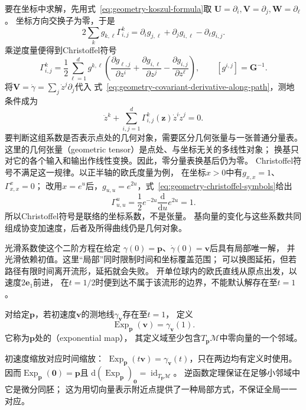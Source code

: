 要在坐标中求解，先用式~\eqref{eq:geometry-koszul-formula}取
$\bm U=\partial_i,\bm V=\partial_j,\bm W=\partial_\ell$。
坐标方向交换子为零，于是
\[
 2\sum_k g_{k,\ell}\Gamma^k_{i,j}
 =\partial_i g_{j,\ell}+\partial_j g_{i,\ell}-\partial_\ell g_{i,j}.
\]
乘逆度量便得到Christoffel符号
\begin{equation}
 \Gamma^k_{i,j}
 =\frac12\sum_{\ell=1}^d g^{k,\ell}
  \left(\frac{\partial g_{\ell,j}}{\partial z^i}
       +\frac{\partial g_{i,\ell}}{\partial z^j}
       -\frac{\partial g_{i,j}}{\partial z^\ell}\right),
 \qquad [g^{i,j}]=\bm G^{-1}.
 \label{eq:geometry-christoffel-symbols}
\end{equation}
将$\bm V=\dot\gamma=\sum_j\dot z^j\partial_j$代入
式~\eqref{eq:geometry-covariant-derivative-along-path}，测地条件成为
\begin{equation}
 \ddot z^k+\sum_{i,j=1}^d
 \Gamma^k_{i,j}(\bm z)\dot z^i\dot z^j=0.
 \label{eq:geometry-geodesic-equation}
\end{equation}
要判断这组系数是否表示点处的几何对象，需要区分几何张量与一张普通分量表。
这里的几何张量（geometric tensor）是点处、与坐标无关的多线性对象；
换基只对它的各个输入和输出作线性变换。因此，零分量表换基后仍为零。
Christoffel符号不满足这一规律。以正半轴的欧氏度量为例，
在坐标$x>0$中有$g_{x,x}=1$、$\Gamma^x_{x,x}=0$；
改用$x=e^u$后，$g_{u,u}=e^{2u}$，式~\eqref{eq:geometry-christoffel-symbols}给出
\[
 \Gamma^u_{u,u}=\frac12 e^{-2u}\frac{\mathrm d}{\mathrm du}e^{2u}=1.
\]
所以Christoffel符号是联络的坐标系数，不是张量。
基向量的变化与这些系数共同组成协变加速度，后者及所得曲线仍是几何对象。

光滑系数使这个二阶方程在给定
$\gamma(0)=\bm p$、$\dot\gamma(0)=\bm v$后具有局部唯一解，
并光滑依赖初值。这里“局部”同时限制时间和坐标覆盖范围；
可以换图延拓，但若路径有限时间离开流形，延拓就会失败。
开单位球内的欧氏直线从原点出发，以速度$2\bm e_1$前进，
在$t=1/2$时便到达不属于该流形的边界，不能默认解存在至$t=1$。

\begin{definition}[指数映射]
\label{def:geometry-exponential-map}
对给定$\bm p$，若初速度$\bm v$的测地线$\gamma_{\bm v}$存在至$t=1$，
定义
\[
 \operatorname{Exp}_{\bm p}(\bm v)=\gamma_{\bm v}(1).
\]
它称为$\bm p$处的（exponential map），
其定义域至少包含$T_{\bm p}\mathcal M$中零向量的一个邻域。
\end{definition}
初速度缩放对应时间缩放：
$\operatorname{Exp}_{\bm p}(t\bm v)=\gamma_{\bm v}(t)$，只在两边均有定义时使用。
因而$\operatorname{Exp}_{\bm p}(\bm0)=\bm p$且
$\mathrm d(\operatorname{Exp}_{\bm p})_{\bm0}=\operatorname{id}_{T_{\bm p}\mathcal M}$。
逆函数定理保证在足够小邻域中它是微分同胚；
这为用切向量表示附近点提供了一种局部方式，不保证全局一一对应。

